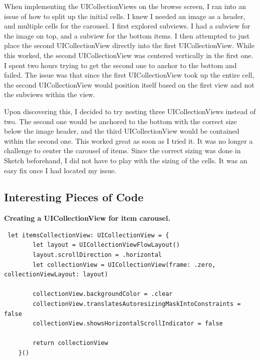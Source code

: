 \documentclass[onecolumn, draftclsnofoot,10pt, compsoc]{IEEEtran}
\begin{document}
\par When implementing the UICollectionViews on the browse screen, I ran into an issue of how to split up the initial cells. I knew I needed an image as a header, and multiple cells for the carousel. I first explored subviews. I had a subview for the image on top, and a subview for the bottom items. I then attempted to just place the second UICollectionView directly into the first UICollectionView. While this worked, the second UICollectionView was centered vertically in the first one. I spent two hours trying to get the second one to anchor to the bottom and failed. The issue was that since the first UICollectionView took up the entire cell, the second UICollectionView would position itself based on the first view and not the subviews within the view.

\par Upon discovering this, I decided to try nesting three UICollectionViews instead of two. The second one would be anchored to the bottom with the correct size below the image header, and the third UICollectionView would be contained within the second one. This worked great as soon as I tried it. It was no longer a challenge to center the carousel of items. Since the correct sizing was done in Sketch beforehand, I did not have to play with the sizing of the cells. It was an easy fix once I had located my issue.

\subsection{Interesting Pieces of Code}
\noindent\textbf{Creating a UICollectionView for item carousel.}
\begin{lstlisting}
 let itemsCollectionView: UICollectionView = {
        let layout = UICollectionViewFlowLayout()
        layout.scrollDirection = .horizontal
        let collectionView = UICollectionView(frame: .zero, collectionViewLayout: layout)
        
        collectionView.backgroundColor = .clear
        collectionView.translatesAutoresizingMaskIntoConstraints = false
        collectionView.showsHorizontalScrollIndicator = false
        
        return collectionView
    }()
\end{lstlisting}
\end{document}

